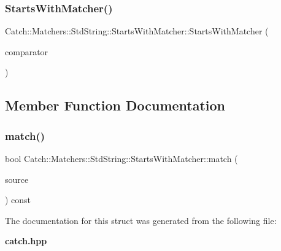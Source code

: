 \subsubsection{StartsWithMatcher()}
{\footnotesize\ttfamily Catch\+::\+Matchers\+::\+Std\+String\+::\+Starts\+With\+Matcher\+::\+Starts\+With\+Matcher (\begin{DoxyParamCaption}\item[{\textbf{ Cased\+String} const \&}]{comparator }\end{DoxyParamCaption})}



\subsection{Member Function Documentation}
\mbox{\label{struct_catch_1_1_matchers_1_1_std_string_1_1_starts_with_matcher_a7da4747aed0c48989d8be59a89e2b7fb}} 
\subsubsection{match()}
{\footnotesize\ttfamily bool Catch\+::\+Matchers\+::\+Std\+String\+::\+Starts\+With\+Matcher\+::match (\begin{DoxyParamCaption}\item[{std\+::string const \&}]{source }\end{DoxyParamCaption}) const\hspace{0.3cm}{\ttfamily [override]}}



The documentation for this struct was generated from the following file\+:\begin{DoxyCompactItemize}
\item 
\textbf{ catch.\+hpp}\end{DoxyCompactItemize}
